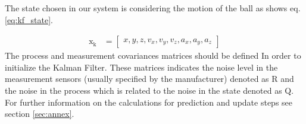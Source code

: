 The state chosen in our system is considering the motion of the ball as shows eq.\ref{eq:kf_state}.

\begin{align}
    \mathrm{x_k} &= \begin{bmatrix}
           x, y, z, v_x, v_y, v_z, a_x, a_y, a_z
         \end{bmatrix}
    \label{eq:kf_state}
  \end{align}
The process and measurement covariances matrices should be defined In order to initialize the Kalman Filter. These matrices indicates the noise level in the measurement sensors (usually specified by the manufacturer) denoted as R and the noise in the process which is related to the noise in the state denoted as Q. For further information on the calculations for prediction and update steps see section \ref{sec:annex}.


